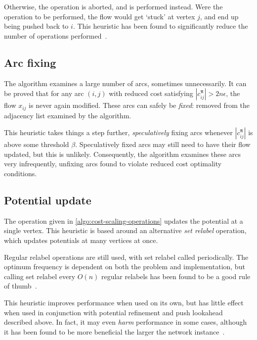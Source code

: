 Otherwise, the  operation is aborted, and  is performed instead. Were the  operation to be performed, the flow would get `stuck' at vertex $j$, and end up being pushed back to $i$. This heuristic has been found to significantly reduce the number of  operations performed~\cite{Goldberg:1997}.

\subsection{Arc fixing}
The algorithm examines a large number of arcs, sometimes unnecessarily. It can be proved that for any arc $(i,j)$ with reduced cost satisfying $\left|c^{\boldsymbol{\pi}}_{ij}\right| > 2n\epsilon$, the flow $x_{ij}$ is never again modified. These arcs can safely be \emph{fixed}: removed from the adjacency list examined by the algorithm. 

This heuristic takes things a step further, \emph{speculatively} fixing arcs whenever $\left|c^{\boldsymbol{\pi}}_{ij}\right|$ is above some threshold $\beta$. Speculatively fixed arcs may still need to have their flow updated, but this is unlikely. Consequently, the algorithm examines these arcs very infrequently, unfixing arcs found to violate reduced cost optimality conditions.

\subsection{Potential update}
The  operation given in \cref{algo:cost-scaling-operations} updates the potential at a single vertex. This heuristic is based around an alternative \emph{set relabel} operation, which updates potentials at many vertices at once.

Regular relabel operations are still used, with set relabel called periodically. The optimum frequency is dependent on both the problem and implementation, but calling set relabel every $O(n)$ regular relabels has been found to be a good rule of thumb~\cite{Goldberg:1997}.

This heuristic improves performance when used on its own, but has little effect when used in conjunction with potential refinement and push lookahead described above. In fact, it may even \emph{harm} performance in some cases, although it has been found to be more beneficial the larger the network instance~\cite{Bunnagel:1998}.